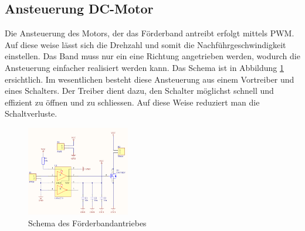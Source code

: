 \subsection{Ansteuerung DC-Motor}
\label{sec:Foerderband}
    Die Ansteuerung des Motors, der das Förderband antreibt erfolgt mittels PWM. Auf diese 
    weise lässt sich die Drehzahl und somit die Nachführgeschwindigkeit einstellen. Das 
    Band muss nur ein eine Richtung angetrieben werden, wodurch die Ansteuerung einfacher 
    realisiert werden kann. Das Schema ist in Abbildung \ref{abb:SchemaAnsteuerung} 
    ersichtlich. Im wesentlichen besteht diese Ansteuerung aus einem Vortreiber und eines 
    Schalters. Der Treiber dient dazu, den Schalter möglichst schnell und effizient zu 
    öffnen und zu schliessen. Auf diese Weise reduziert man die Schaltverluste. 
    \begin{figure}[h!]
    	\includegraphics[width=0.4\textwidth,clip,trim=0mm 0mm 0mm 0mm]
    	{Enddokumentation/Bilder/Schema_DC-Ansteuerung.png}
    	\centering
    	\caption{Schema des Förderbandantriebes}
    	\label{abb:SchemaAnsteuerung}
    \end{figure}
    
\newpage
